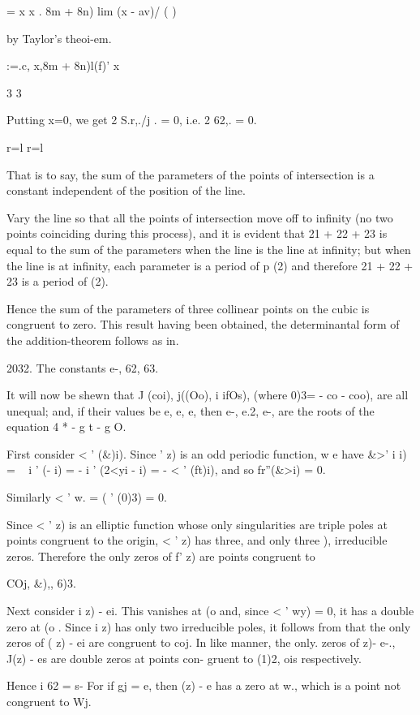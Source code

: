 {= x x . 8m + 8n) lim (x - av)/ ( )

by Taylor's theoi-em.

:=.c, x,8m + 8n)l(f)' x \

3 3

Putting x=0, we get 2 S.r,./j . = 0, i.e. 2 62,. = 0.

r=l r=l

That is to say, the sum of the parameters of the points of
intersection is a constant independent of the position of the line.

Vary the line so that all the points of intersection move off to
infinity (no two points coinciding during this process), and it is
evident that 21 + 22 + 23 is equal to the sum of the parameters when
the line is the line at infinity; but when the line is at infinity,
each parameter is a period of p (2) and therefore 21 + 22 + 23 is a
period of (2).

Hence the sum of the parameters of three collinear points on the cubic
is congruent to zero. This result having been obtained, the
determinantal form of the addition-theorem follows as in.

2032. The constants e-, 62, 63.

It will now be shewn that J (coi), j((Oo), i ifOs), (where 0)3= - co -
coo), are all unequal; and, if their values be e, e, e, then e-,
e.2, e-, are the roots of the equation 4 * - g t - g O.

First consider < ' (\&)i). Since ' z) is an odd periodic function, w e
have \&>' i i) = ~ i ' (- i) = - i ' (2<yi - i) = - < ' (ft)i), and so
fr''(\&>i) = 0.

Similarly < ' w. = ( ' (0)3) = 0.

Since < ' z) is an elliptic function whose only singularities are
triple poles at points congruent to the origin, < ' z) has three, and
only three ), irreducible zeros. Therefore the only zeros of
f' z) are points congruent to

COj, \&),, 6)3.

Next consider i z) - ei. This vanishes at (o and, since < ' wy) = 0,
it has a double zero at (o . Since i z) has only two irreducible
poles, it follows from that the only zeros of ( z) - ei are
congruent to coj. In like manner, the only. zeros of z)- e-., J(z) -
es are double zeros at points con- gruent to (1)2, ois respectively.

Hence i 62 = s- For if gj = e, then (z) - e has a zero at w., which
is a point not congruent to Wj.

}
